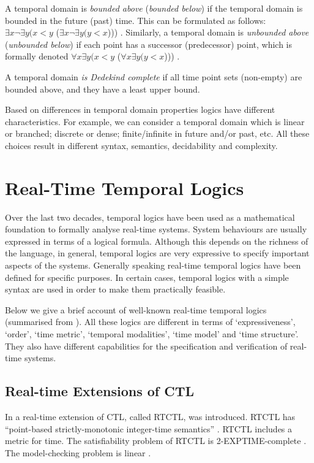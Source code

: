 \documentclass[11pt]{article}
\begin{document}
A temporal domain is \emph{bounded above} (\emph{bounded below}) if the temporal domain is bounded in the future (past) time. This can be formulated as follows: $\exists x \neg\exists y (x<y$ ($\exists x \neg\exists y (y<x$))) \cite{Spr02}. Similarly, a temporal domain is \emph{unbounded above} (\emph{unbounded below}) if each point has a successor (predecessor) point, which is formally denoted  $\forall x \exists y (x<y$  ($\forall x \exists y (y<x$))) \cite{Spr02}. 

A temporal domain \emph{is Dedekind complete} if all time point sets (non-empty) are bounded above, and they have a least upper bound.

Based on differences in temporal domain properties logics have different characteristics. For example, we can consider a temporal domain which is linear or branched; discrete or dense; finite/infinite in future and/or past, etc. All these choices result in different syntax, semantics, decidability and complexity. 

\section{Real-Time Temporal Logics}

Over the last two decades, temporal logics have been used as a mathematical foundation to formally analyse real-time systems. System behaviours are usually expressed in terms of a logical formula. Although this depends on the richness of the language, in general, temporal logics are very expressive to specify important aspects of the systems. Generally speaking real-time temporal logics have been defined for specific purposes. In certain cases, temporal logics with a simple syntax are used in order to make them practically feasible. 

Below we give a brief account of well-known real-time temporal logics (summarised from \cite{Ost92,AHT92,BMN00}). All these logics are different in terms of `expressiveness', `order', `time metric', `temporal modalities', `time model' and `time structure'. They also have different capabilities for the specification and verification of real-time systems.

\subsection{Real-time Extensions of CTL}

In \cite{EMSS89} a real-time extension of CTL, called RTCTL, was introduced. RTCTL has ``point-based strictly-monotonic integer-time semantics'' \cite{AHT92}. RTCTL includes a metric for time. The satisfiability problem of RTCTL is 2-EXPTIME-complete \cite{EMSS89}. The model-checking problem is linear \cite{EMSS89}.
\end{document}
